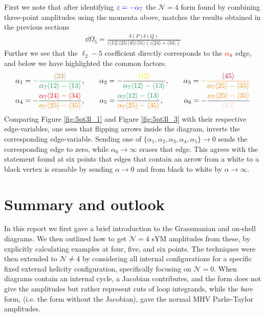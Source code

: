 \documentclass[letter,11pt]{article}
\newcommand{\pink}[1]{\textcolor{pink}{#1}}
\newcommand{\green}[1]{\textcolor{ForestGreen}{#1}}
\newcommand{\orange}[1]{\textcolor{orange}{#1}}
\newcommand{\brown}[1]{\textcolor{brown}{#1}}
\newcommand{\ab}[1]{\langle #1 \rangle}
\begin{document}
First we note that after identifying $\textcolor{blue}{z=-\alpha_7}$ the $\mathcal{N}=4$ form found by combining three-point amplitudes using the momenta above, matches the results obtained in the previous sections
\begin{equation}
	\begin{aligned}
	\dd \Omega_5=\frac{\delta(P)\delta(Q)}{z \ab{12}\ab{23}\ab{45}\ab{51}\left(z\ab{24}+\ab{34}\right)}
	\end{aligned}
\end{equation}
Further we see that the $\ell_2-5$ coefficient directly corresponds to the $\textcolor{red}{\alpha_4}$ edge, and below we have highlighted the common factors.
\begin{equation}
	\begin{aligned}
		\alpha_1&=\textcolor{ForestGreen}{-\frac{\brown{\ab{23}}}{\alpha_7\ab{12}-\ab{13}}},~~~~~~
		\alpha_2=-\frac{\textcolor{yellow}{\ab{12}}}{\green{\alpha_7\ab{12}-\ab{13}}},~~~~~~
		\alpha_3=\textcolor{orange}{-\frac{\textcolor{purple}{\ab{45}}}{\alpha_7\ab{25}-\ab{35}}}\\
		\alpha_4&=-\frac{\textcolor{red}{\alpha_7\ab{24}-\ab{34}}}{\orange{\alpha_7\ab{25}-\ab{35}}}
		,~~~~~~
		\alpha_5=\frac{\green{\alpha_7\ab{12}-\ab{13}}}{\orange{\alpha_7\ab{25}-\ab{35}}}
		,~~~~~~~~\,
		\alpha_6=-\frac{\orange{\alpha_7\ab{25}-\ab{35}}}{\pink{\ab{15}}}
	\end{aligned}
\end{equation}
Comparing Figure \ref{fig:5pt3l_1} and Figure \ref{fig:5pt3l_3} with their respective edge-variables, one sees that flipping arrows inside the diagram, inverts the corresponding edge-variable. Sending one of $\{\alpha_1,\alpha_2,\alpha_3,\alpha_4,\alpha_5\}\to 0$ sends the corresponding edge to zero, while $\alpha_6\to\infty $ erases that edge. This agrees with the statement found at six points that edges that contain an arrow from a white to a black vertex is erasable by sending $\alpha\to 0$ and from black to white by $\alpha\to \infty$.  
\newpage
\section{Summary and outlook}
In this report we first gave a brief introduction to the Grassmanian and on-shell diagrams. We then outlined how to get  $\mathcal{N}=4$ sYM amplitudes from these, by explicitly calculating examples at four, five, and six points. The techniques were then extended to $\mathcal{N}\neq4$ by considering all internal configurations for a specific fixed external helicity configuration, specifically focusing on $\mathcal{N}=0$. When diagrams contain an internal cycle, a Jacobian contributes, and the form does not give the amplitudes but rather represent cuts of loop integrands, while the \textit{bare} form, (i.e. the form without the Jacobian), gave the normal MHV Parke-Taylor amplitudes.
\end{document}

